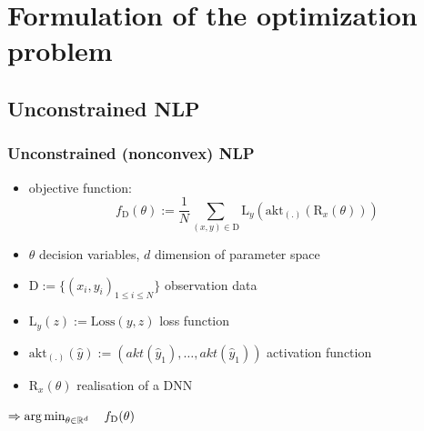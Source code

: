 

\beamertemplatenavigationsymbolsempty{}




\section{Formulation of the optimization problem}

\subsection{Unconstrained NLP}

\begin{frame}
\frametitle{Unconstrained (nonconvex) NLP}
\begin{itemize}
	
	\item[] objective function:
	$$f_{\mathrm{D}}(\theta) := \frac{1}{N}\sum_{(x, y)\in\mathrm{D}}^{}\mathrm{L}_{y}(\text{akt}_{(.)}(\mathrm{R}_{x}(\theta)))$$
	\pause
	
	\item $\theta$ decision variables, $d$ dimension of parameter space
	
	\item $\mathrm{D} := \{(x_{i}, y_{i})_{1\leq i\leq N}\}$ observation data
	
	\item $\mathrm{L}_{y}(z) := \text{Loss}(y, z)$ loss function 
	
	\item $\text{akt}_{(.)}(\hat{y}) := \left(akt(\hat{y}_{1}), \ldots, akt(\hat{y}_{1})\right)$ activation function %
	
	\item $\mathrm{R}_{x}(\theta)$ realisation of a DNN
	
\end{itemize}

\begin{center}
	$\Rightarrow \operatorname*{arg\,min}_{\theta\in\mathbb{R}^{d}}\quad f_{\mathrm{D}}(\theta)$
\end{center}

\end{frame}










